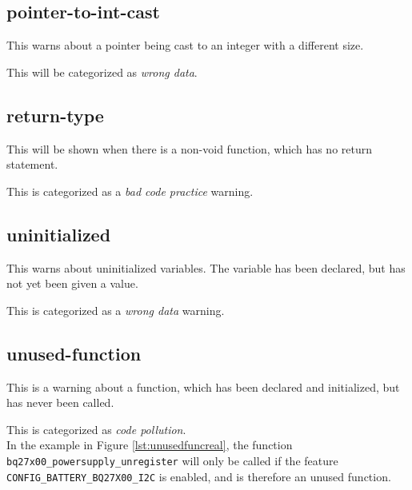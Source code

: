 \documentclass[a4paper,11pt]{report}
\begin{document}
            \subsection*{pointer-to-int-cast}
This warns about a pointer being cast to an integer with a different size.

This will be categorized as \emph{wrong data}.


            \subsection*{return-type}
This will be shown when there is a non-void function, which has no return 
statement.

This is categorized as a \emph{bad code practice} warning.


            %

            \subsection*{uninitialized}
This warns about uninitialized variables. The variable has been declared, but 
has not yet been given a value.

This is categorized as a \emph{wrong data} warning.


            \subsection*{unused-function}
This is a warning about a function, which has been declared and initialized, 
but has never been called. 

This is categorized as \emph{code pollution}.
\\

In the example in Figure \ref{lst:unusedfuncreal}, the function 
\texttt{bq27x00\_powersupply\_unregister} will only be called if the feature 
\texttt{CONFIG\_BATTERY\_BQ27X00\_I2C} is enabled, and is therefore an 
unused function.
\end{document}
